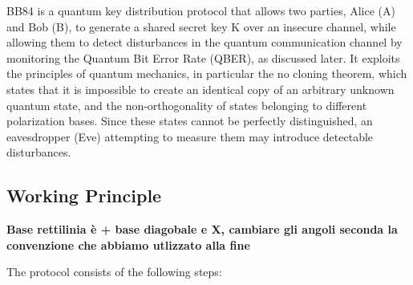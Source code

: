 \documentclass[10pt,letterpaper]{report}
\begin{document}
BB84 is a quantum key distribution protocol that allows two parties, Alice (A) and Bob (B), to generate a shared secret key K over an insecure channel, while allowing them to detect disturbances in the quantum communication channel by monitoring the Quantum Bit Error Rate (QBER), as discussed later.
It exploits the principles of quantum mechanics, in particular the no cloning theorem,
which states that it is impossible to create an identical copy of an arbitrary unknown quantum state,
and the non-orthogonality of states belonging to different polarization bases.
Since these states cannot be perfectly distinguished, an eavesdropper (Eve) attempting to measure them may introduce detectable disturbances.

\subsection{Working Principle}

\large \textbf{Base rettilinia è + base diagobale e X, cambiare gli angoli seconda la convenzione che abbiamo utlizzato alla fine}

The protocol consists of the following steps:
\end{document}
